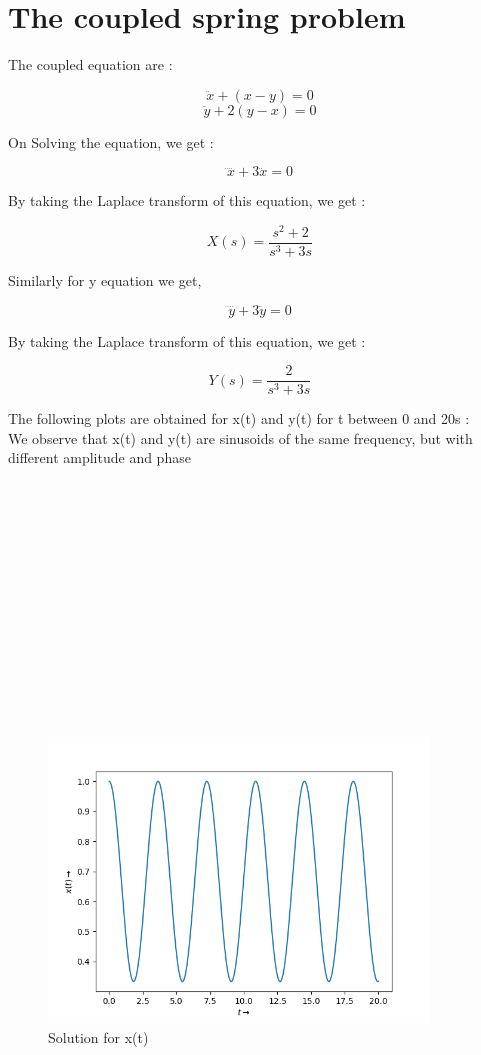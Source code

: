 \documentclass[10pt,a4paper]{article}
\begin{document}
\section{The coupled spring problem}

The coupled equation are : 

$$ \ddot{x} + (x - y) = 0  $$
$$ \ddot{y} + 2(y - x) = 0  $$

On Solving the equation, we get : 

$$ \ddddot{x} + 3\ddot{x} = 0  $$

By taking the Laplace transform of this equation, we get : 

\[
    X(s) = \frac{s^2+2}{s^3 + 3s}
\]

Similarly for y equation we get, 

$$ \ddddot{y} + 3\ddot{y} = 0  $$

By taking the Laplace transform of this equation, we get : 

\[
    Y(s) = \frac{2}{s^3 + 3s}
\]

The following plots are obtained for x(t) and y(t) for t between 0 and 20s :\\
We observe that x(t) and y(t) are sinusoids of the same frequency, but with different amplitude and phase\\ \\ \\ \\ \\ \\ \\ \\ \\ \\ \\ \\ \\ \\ 

\begin{figure}[!tbh]

\includegraphics[width = 0.9\textwidth]{4a.png}
\caption{Solution for x(t)}

\end{figure}
\end{document}
